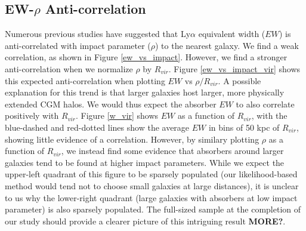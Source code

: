 \documentclass[iop]{emulateapj-rtx4}
\begin{document}
\vspace{10pt}


\subsection{EW-$\rho$ Anti-correlation}
Numerous previous studies have suggested that Ly$\alpha$ equivalent width ($EW$) is anti-correlated with impact parameter ($\rho$) to the nearest galaxy. We find a weak correlation, as shown in Figure \ref{ew_vs_impact}. However, we find a stronger anti-correlation when we normalize $\rho$ by $R_{vir}$. Figure \ref{ew_vs_impact_vir} shows this expected anti-correlation when plotting $EW$ vs $\rho/R_{vir}$. A possible explanation for this trend is that larger galaxies host larger, more physically extended CGM halos. We would thus expect the absorber $EW$ to also correlate positively with $R_{vir}$. Figure \ref{w_vir} shows $EW$ as a function of $R_{vir}$, with the blue-dashed and red-dotted lines show the average $EW$ in bins of 50 kpc of $R_{vir}$, showing little evidence of a correlation. However, by similary plotting $\rho$ as a function of $R_{vir}$, we instead find some evidence that absorbers around larger galaxies tend to be found at higher impact parameters. While we expect the upper-left quadrant of this figure to be sparsely populated (our likelihood-based method would tend not to choose small galaxies at large distances), it is unclear to us why the lower-right quadrant (large galaxies with absorbers at low impact parameter) is also sparsely populated. The full-sized sample at the completion of our study should provide a clearer picture of this intriguing result \textbf{MORE?}.


\end{document}
